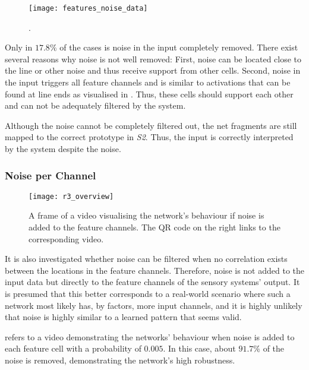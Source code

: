 \begin{figure}[h]
    \centering
    \texttt{[image: features\_noise\_data]}
    \caption[Features triggered by noise]{.}
\end{figure}
%
Only in $17.8\%$ of the cases is noise in the input completely removed. There exist several reasons why noise is not well removed: First, noise can be located close to the line or other noise and thus receive support from other cells. Second, noise in the input triggers all feature channels and is similar to activations that can be found at line ends as visualised in .
Thus, these cells should support each other and can not be adequately filtered by the system.

Although the noise cannot be completely filtered out, the net fragments are still mapped to the correct prototype in \emph{S2}. Thus, the input is correctly interpreted by the system despite the noise.

\subsubsection{Noise per Channel}
%
\begin{figure}[h]
    \centering
    \texttt{[image: r3\_overview]}
    \caption[Video visualising the network's behaviour with noise in the feature channels]{A frame of a video visualising the network's behaviour if noise is added to the feature channels. The QR code on the right links to the corresponding video.}
\end{figure}
%
It is also investigated whether noise can be filtered when no correlation exists between the locations in the feature channels.
Therefore, noise is not added to the input data but directly to the feature channels of the sensory systems' output.
It is presumed that this better corresponds to a real-world scenario where such a network most likely has, by factors, more input channels, and it is highly unlikely that noise is highly similar to a learned pattern that seems valid.

 refers to a video demonstrating the networks' behaviour when noise is added to each feature cell with a probability of $0.005$.
In this case, about $91.7\%$ of the noise is removed, demonstrating the network's high robustness.


